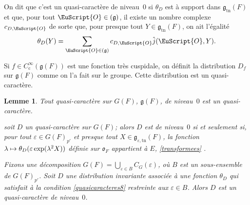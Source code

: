 \documentclass[JEP,XML,SOM,Unicode,francais]{cedram}
\let\mathcal \EuScript
\let\oldenumerate\enumerate
\renewcommand{\enumerate}{\oldenumerate\itemindent0pt}
\newenvironment{enumeratei}
{\bgroup\def\theenumi{\roman{enumi}}\def\theenumii{\arabic{enumii}}\oldenumerate}
{\endenumerate\egroup}
\newcommand{\NoChangel}[1]{%
\expandafter\let\csname old\string#1\endcsname=#1
\let#1=\relax
\newcommand{#1}{\mathcode`l="716C\csname old\string#1\endcsname\mathcode`l="7160 }%
}
\let\epsilon\varepsilon
\newcommand\mto{\mathchoice{\longmapsto}{\mapsto}{\mapsto}{\mapsto}}
\newcommand{\frg}{\mathfrak{g}}
\newcommand{\fro}{\mathfrak{o}}
\newcommand{\rc}{\mathrm{c}}
\newcommand{\Nil}{\mathrm{Nil}} \NoChangel{\Nil}
\newcommand{\tn}{\mathrm{tn}}
\newcommand{\cO}{\mathcal{O}}
\theoremstyle{plain}
\newtheorem*{lem*}{Lemme}
\theoremstyle{definition}
\begin{document}
On dit que c'est un quasi-caractère de niveau~$0$ si $\theta_{D}$ est à support dans $\frg_{\tn}(F)$ et que, pour tout $\cO\in \Nil(\frg)$, il existe un nombre complexe $c_{D,\cO}$ de sorte que, pour presque tout $Y\in \frg_{\tn}(F)$, on ait l'égalité
\[
\theta_{D}(Y)=\sum_{\cO\in \Nil(\frg)}c_{D,\cO}\hat{j}(\cO,Y).
\]

Si $f\in C_{\rc}^{\infty}(\frg(F))$ est une fonction très cuspidale, on définit la distribution $D_{f}$ sur $\frg(F)$ comme on l'a fait sur le groupe. Cette distribution est un quasi-caractère.

\skpt
\begin{lem*}
\begin{enumeratei}
\item\label{quasicaracteresi}
Tout quasi-caractère sur $G(F)$, \resp $\frg(F)$, de niveau~$0$ est un quasi-caractère.

\item\label{quasicaracteresii}
soit $D$ un quasi-caractère sur $G(F)$; alors $D$ est de niveau~$0$ si et seulement si, pour tout $\epsilon\in G(F)_{p'}$ et presque tout $X\in \frg_{\epsilon,\tn}(F)$, la fonction $\lambda\mto \theta_{D}(\epsilon \exp(\lambda^2X))$ définie sur $\fro_{F}$ appartient à $E$, \cf \ref{transformees} .

\item\label{quasicaracteresiii}
Fixons une décomposition $G(F)=\bigcup_{\epsilon\in B}C_{G}(\epsilon)$, où $B$ est un sous-ensemble de $G(F)_{p'}$. Soit $D$ une distribution invariante associée à une fonction $\theta_{D}$ qui satisfait à la condition \eqref{quasicaracteres8} restreinte aux $\epsilon\in B$. Alors $D$ est un quasi-caractère de niveau~$0$.
\end{enumeratei}
\end{lem*}
\end{document}
